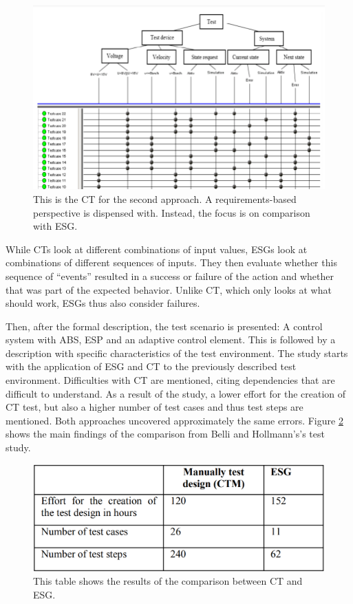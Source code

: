 \begin{figure}[H]
\centering
\includegraphics[scale=0.6]{../../individual/groeger/images/ClassificationTreeExample2.png} 
\caption{This is the CT for the second approach. A requirements-based perspective is dispensed with. Instead, the focus is on comparison with ESG.}
\label{fig:Approach2_CT}
\end{figure}

While CTs look at different combinations of input values, ESGs look at combinations of different sequences of inputs. They then evaluate whether this sequence of \enquote{events} resulted in a success or failure of the action and whether that was part of the expected behavior. Unlike CT, which only looks at what should work, ESGs thus also consider failures.

Then, after the formal description, the test scenario is presented: A control system with ABS, ESP and an adaptive control element. This is followed by a description with specific characteristics of the test environment. The study starts with the application of ESG and CT to the previously described test environment. Difficulties with CT are mentioned, citing dependencies that are difficult to understand. As a result of the study, a lower effort for the creation of CT test, but also a higher number of test cases and thus test steps are mentioned. Both approaches uncovered approximately the same errors. Figure \ref{fig:Comparison_CG_ESG} shows the main findings of the comparison from Belli and Hollmann's\cite{Belli}'s test study.

\begin{figure}[H]
\centering
\includegraphics[scale=0.4]{../../individual/groeger/images/Comparison_CG_ESG.png} 
\caption{This table shows the results of the comparison between CT and ESG.}
\label{fig:Comparison_CG_ESG}
\end{figure}

